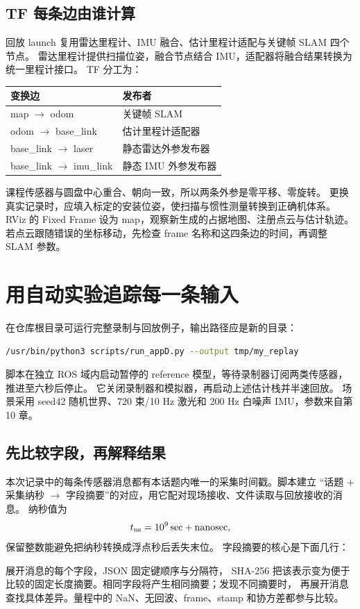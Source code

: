 \subsection{TF 每条边由谁计算}
回放 launch 复用雷达里程计、IMU 融合、估计里程计适配与关键帧 SLAM 四个节点。
雷达里程计提供扫描位姿，融合节点结合 IMU，适配器将融合结果转换为统一里程计接口。
TF 分工为：
\begin{center}\small
\begin{tabular}{ll}\toprule
变换边 & 发布者\\\midrule
map $\to$ odom & 关键帧 SLAM\\
odom $\to$ base\_link & 估计里程计适配器\\
base\_link $\to$ laser & 静态雷达外参发布器\\
base\_link $\to$ imu\_link & 静态 IMU 外参发布器\\\bottomrule
\end{tabular}
\end{center}
课程传感器与圆盘中心重合、朝向一致，所以两条外参是零平移、零旋转。
更换真实记录时，应填入标定的安装位姿，使扫描与惯性测量转换到正确机体系。
RViz 的 Fixed Frame 设为 map，观察新生成的占据地图、注册点云与估计轨迹。
若点云跟随错误的坐标移动，先检查 frame 名称和这四条边的时间，再调整 SLAM 参数。

\section{用自动实验追踪每一条输入}
在仓库根目录可运行完整录制与回放例子，输出路径应是新的目录：
\begin{lstlisting}[language=bash,numbers=none]
/usr/bin/python3 scripts/run_appD.py --output tmp/my_replay
\end{lstlisting}
脚本在独立 ROS 域内启动暂停的 reference 模型，等待录制器订阅两类传感器，推进至六秒后停止。
它关闭录制器和模拟器，再启动上述估计栈并半速回放。
场景采用 seed42 随机世界、720 束/10 Hz 激光和 200 Hz 白噪声 IMU，参数来自第 10 章。

\subsection{先比较字段，再解释结果}
本次记录中的每条传感器消息都有本话题内唯一的采集时间戳。脚本建立
“话题 $+$ 采集纳秒 $\to$ 字段摘要”的对应，用它配对现场接收、文件读取与回放接收的消息。
纳秒值为
\[
 t_{\rm ns}=10^9\,\text{sec}+\text{nanosec},
\]
保留整数能避免把纳秒转换成浮点秒后丢失末位。
字段摘要的核心是下面几行：

 展开消息的每个字段，JSON 固定键顺序与分隔符，
SHA-256 把该表示变为便于比较的固定长度摘要。相同字段将产生相同摘要；发现不同摘要时，
再展开消息查找具体差异。量程中的 NaN、无回波、frame、stamp 和协方差都参与比较。

